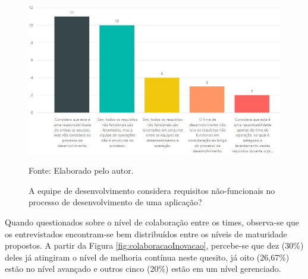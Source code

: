 \documentclass[twoside,english,brazilian]{UNISINOSartigo}
\newcommand{\source}[1]{\caption*{Fonte: {#1}} }
\begin{document}
\begin{figure}[H]
    \centering
    \caption{A equipe de desenvolvimento considera requisitos não-funcionais no processo de desenvolvimento de uma aplicação?}
       \includegraphics[scale=.6]{imagens/requisitos.JPG}
        \source{Elaborado pelo autor.}
    \label{fig:requisitos}
\end{figure}

Quando questionados sobre o nível de colaboração entre os times, observa-se que os entrevistados encontram-se bem distribuídos entre os níveis de maturidade propostos. A partir da Figura \ref{fig:colaboracaoInovacao}, percebe-se que dez (30\%) deles já atingiram o nível de melhoria contínua neste quesito, já oito (26,67\%) estão no nível avançado e outros cinco (20\%) estão em um nível gerenciado. 
\end{document}
